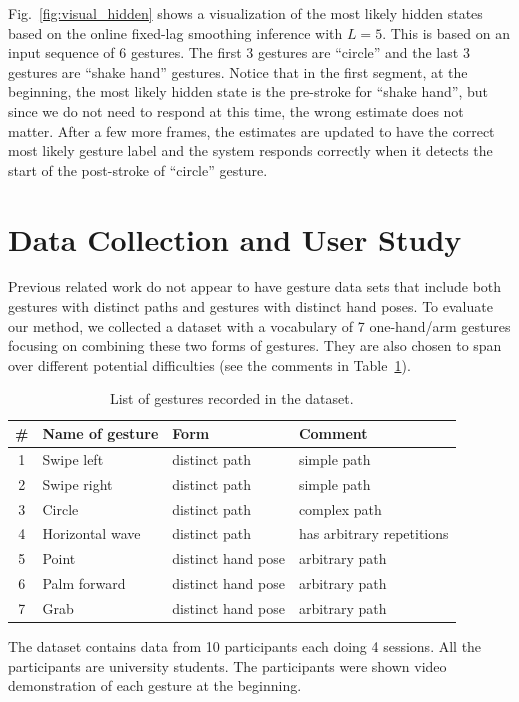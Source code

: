 \documentclass[conference]{IEEEtran}
\begin{document}
Fig.~\ref{fig:visual_hidden} shows a visualization of the
most likely hidden states based on the online fixed-lag smoothing inference
with $L = 5$.
This is based on an input sequence of 6 gestures. The first 3 gestures are
``circle'' and the last 3 gestures are ``shake hand'' gestures. Notice that in
the first segment, at the beginning, the most likely hidden state is the
pre-stroke for ``shake hand'', but since we do not need to respond at this time,
the wrong estimate does not matter. After a few more frames, the estimates are
updated to have the correct most likely gesture label and the system
responds correctly when it detects the start of the post-stroke of ``circle''
gesture.

\section{Data Collection and User Study}
Previous related work do not appear to have gesture data sets
that include both gestures with distinct paths and gestures with distinct hand
poses. To evaluate our method, we collected a dataset with a vocabulary of 7
one-hand/arm gestures focusing on combining these two forms of gestures. They
are also chosen to span over different potential difficulties (see the comments in Table~\ref{tab:gestures}).

\begin{table}
\caption{List of gestures recorded in the dataset.}
\label{tab:gestures}
\centering
\begin{tabular}{|c|l|l|l|}
\hline
\# & Name of gesture & Form & Comment \\
\hline
1 & Swipe left & distinct path & simple path \\
\hline
2 & Swipe right & distinct path & simple path \\
\hline
3 & Circle & distinct path & complex path \\
\hline
4 & Horizontal wave & distinct path & has arbitrary repetitions \\
\hline
5 & Point & distinct hand pose & arbitrary path \\
\hline
6 & Palm forward & distinct hand pose & arbitrary path \\
\hline
7 & Grab & distinct hand pose & arbitrary path \\
\hline
\end{tabular}
\end{table}

The dataset contains data from 10 participants each
doing 4 sessions. All the participants are university students.
The participants were shown video demonstration of each gesture at the beginning. 
\end{document}
